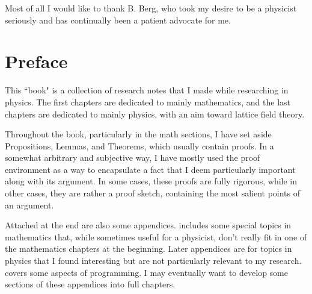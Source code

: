 \documentclass[12pt]{book}
\theoremstyle{definition}
\begin{document}
Most of all I would like to thank B. Berg, who took my desire to be a
physicist seriously and has continually been a patient advocate for me.

\chapter{Preface}
This ``book" is a collection of research notes that I made while researching in
physics. The first chapters are dedicated to mainly mathematics, and the last
chapters are dedicated to mainly physics, with an aim toward lattice field
theory. 

Throughout the book, particularly in the math sections, I have set aside
Propositions, Lemmas, and Theorems, which usually contain proofs. 
In a somewhat arbitrary and
subjective way, I have mostly used the proof environment as a way to encapsulate
a fact that I deem particularly important along with its argument.
In some cases, these proofs are fully rigorous, while in other cases, they are 
rather a proof sketch,
containing the most salient points of an argument. 

Attached at the end are also some appendices. 
 includes some special topics in mathematics 
that, while sometimes useful for a physicist, don't really fit in one of 
the mathematics chapters at the beginning.
Later appendices are for topics in physics that I found interesting but are
not particularly relevant to my research.
 covers some aspects of programming. 
I may eventually want
to develop some sections of these appendices into full chapters.


\tableofcontents                        %
\mainmatter                             %




%










\begin{appendices}




%


\end{appendices}


\printindex
\end{document}
